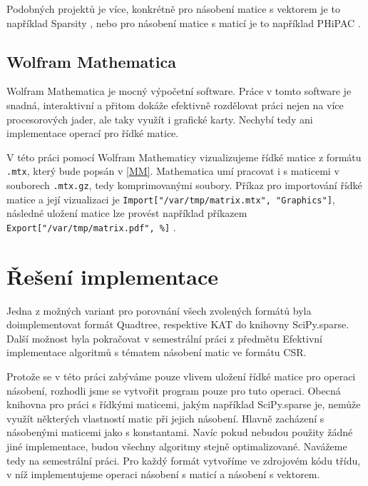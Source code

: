 Podobných projektů je více, konkrétně pro násobení matice s vektorem je to například Sparsity \cite{sparsity}, nebo pro násobení matice s maticí je to například PHiPAC \cite{PHiPAC}\cite{bilmes96a}.

\subsection{Wolfram Mathematica}

Wolfram Mathematica \cite{mathematica} je mocný výpočetní software. Práce v tomto software je snadná, interaktivní a přitom dokáže efektivně rozdělovat práci nejen na více procesorových jader, ale taky využít i grafické karty. Nechybí tedy ani implementace operací pro řídké matice.

V této práci pomocí Wolfram Mathematicy vizualizujeme řídké matice z formátu \texttt{.mtx}, který bude popsán v \ref{MM}. Mathematica umí pracovat i s maticemi v souborech \texttt{.mtx.gz}, tedy komprimovanými soubory. Příkaz pro importování řídké matice a její vizualizaci je \texttt{Import["/var/tmp/matrix.mtx", "Graphics"]}, následné uložení matice lze provést například příkazem \\ \texttt{Export["/var/tmp/matrix.pdf", \%]} \cite{mathematicaMTX}.

\section{Řešení implementace}

Jedna z možných variant pro porovnání všech zvolených formátů byla doimplementovat formát Quadtree, respektive KAT do knihovny SciPy.sparse. Další možnost byla pokračovat v semestrální práci z předmětu Efektivní implementace algoritmů s tématem násobení matic ve formátu CSR.

Protože se v této práci zabýváme pouze vlivem uložení řídké matice pro operaci násobení, rozhodli jsme se vytvořit program pouze pro tuto operaci. Obecná knihovna pro práci s řídkými maticemi, jakým například SciPy.sparse je, nemůže využít některých vlastností matic při jejich násobení. Hlavně zacházení s násobenými maticemi jako s konstantami. Navíc pokud nebudou použity žádné jiné implementace, budou všechny algoritmy stejně optimalizované. Navážeme tedy na semestrální práci. Pro každý formát vytvoříme ve zdrojovém kódu třídu, v níž implementujeme operaci násobení s maticí a násobení s vektorem.
